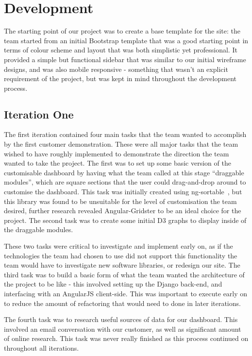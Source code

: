 \documentclass{l3proj}
\begin{document}
\section{Development}
\label{sec:development}

The starting point of our project was to create a base template for the site: the team started from an initial Bootstrap template that was a good starting point in terms of colour scheme and layout that was both simplistic yet professional. It provided a simple but functional sidebar that was similar to our initial wireframe designs, and was also mobile responsive - something that wasn't an explicit requirement of the project, but was kept in mind throughout the development process.

\subsection{Iteration One}
\label{sec:development:iteration-one}

The first iteration contained four main tasks that the team wanted to accomplish by the first customer demonstration. These were all major tasks that the team wished to have roughly implemented to demonstrate the direction the team wanted to take the project. The first was to set up some basic version of the customisable dashboard by having what the team called at this stage ``draggable modules'', which are square sections that the user could drag-and-drop around to customise the dashboard. This task was initially created using ng-sortable~\cite{NGSortable}, but this library was found to be unsuitable for the level of customisation the team desired, further research revealed Angular-Gridster to be an ideal choice for the project. The second task was to create some initial D3 graphs to display inside of the draggable modules.

These two tasks were critical to investigate and implement early on, as if the technologies the team had chosen to use did not support this functionality the team would have to investigate new software libraries, or redesign our site. The third task was to build a basic form of what the team wanted the architecture of the project to be like - this involved setting up the Django back-end, and interfacing with an AngularJS client-side. This was important to execute early on to reduce the amount of refactoring that would need to done in later iterations.

The fourth task was to research useful sources of data for our dashboard. This involved an email conversation with our customer, as well as significant amount of online research. This task was never really finished as this process continued on throughout all iterations.
\end{document}
